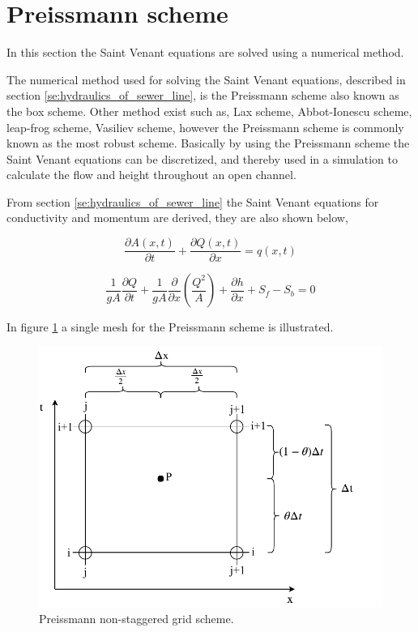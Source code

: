 ﻿\section{Preissmann scheme}\label{subse:preissmann_scheme}
In this section the Saint Venant equations are solved using a numerical method. 


The numerical method used for solving the Saint Venant equations, described in section \ref{se:hydraulics_of_sewer_line}, is the Preissmann scheme also known as the box scheme. Other method exist such as, Lax scheme, Abbot-Ionescu scheme, leap-frog scheme, Vasiliev scheme, however the Preissmann scheme is commonly known as the most robust scheme. Basically by using the Preissmann scheme the Saint Venant equations can be discretized, and thereby used in a simulation to calculate the flow and height throughout an open channel.   

From section \ref{se:hydraulics_of_sewer_line} the Saint Venant equations for conductivity and momentum are derived, they are also shown below,

\begin{equation}\label{eq:saintbernard_mass_preiss}
\frac{\partial A(x,t)}{\partial t} + \frac{\partial Q(x,t)}{\partial x}=q(x,t)
\end{equation}

\begin{equation}\label{eq:saintbernard_momentum_preiss}
\frac{1}{gA} \frac{\partial Q}{\partial t} +\frac{1}{gA}\frac{\partial}{\partial x} \left( \frac{Q^2}{A} \right) + \frac{\partial h}{\partial x} + S_f - S_b = 0
\end{equation}


In figure \ref{fig:preissmann_grid_scheme} a single mesh for the Preissmann scheme is illustrated.

\begin{figure}[H]
\centering
\includegraphics[width=.6\textwidth]{report/simulation/pictures/preissmann_scheme}
\caption{Preissmann non-staggered grid scheme.}
\label{fig:preissmann_grid_scheme}
\end{figure} 

